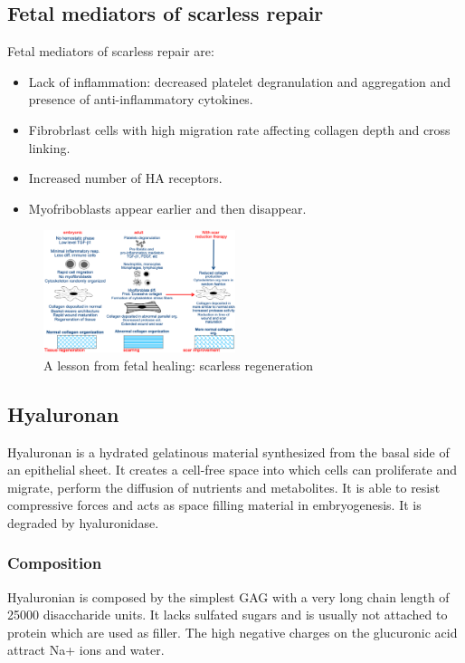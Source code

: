 	\subsection{Fetal mediators of scarless repair}
	Fetal mediators of scarless repair are:

	\begin{multicols}{2}
		\begin{itemize}
			\item Lack of inflammation: decreased platelet degranulation and aggregation and presence of anti-inflammatory cytokines.
			\item Fibrobrlast cells with high migration rate affecting collagen depth and cross linking.
			\item Increased number of HA receptors.
			\item Myofriboblasts appear earlier and then disappear.
		\end{itemize}
	\end{multicols}

	\begin{figure}[h]
		\centering
		\includegraphics[width=0.5\textwidth]{scar.png}
		\caption{\label{fig:scar}A lesson from fetal healing: scarless regeneration}
	\end{figure}

	\subsection{Hyaluronan}
	Hyaluronan is a hydrated gelatinous material synthesized from the basal side of an epithelial sheet.
	It creates a cell-free space into which cells can proliferate and migrate, perform the diffusion of nutrients and metabolites.
	It is able to resist compressive forces and acts as space filling material in embryogenesis.
	It is degraded by hyaluronidase.

		\subsubsection{Composition}
		Hyaluronian is composed by the simplest GAG with a very long chain length of 25000 disaccharide units.
		It lacks sulfated sugars and is usually not attached to protein which are used as filler.
		The high negative charges on the glucuronic acid attract Na+ ions and water.

